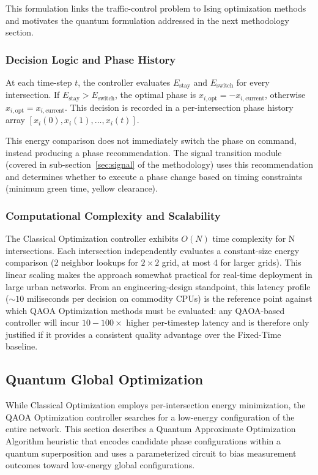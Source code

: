 \documentclass[12pt]{article}
\begin{document}
This formulation links the traffic-control problem to Ising optimization methods and motivates the quantum formulation addressed in the next methodology section.

\subsubsection{Decision Logic and Phase History}

At each time-step $t$, the controller evaluates $E_{\text{stay}}$ and $E_{\text{switch}}$ for every intersection. If $E_{\text{stay}} > E_{\text{switch}}$, the optimal phase is $x_{i,\text{opt}} = -x_{i,\text{current}}$, otherwise $x_{i,\text{opt}} = x_{i,\text{current}}$. This decision is recorded in a per-intersection phase history array $[x_{i}(0), x_{i}(1), \ldots, x_{i}(t)]$.


This energy comparison does not immediately switch the phase on command, instead producing a phase recommendation. The signal transition module (covered in sub-section~\ref{sec:signal} of the methodology) uses this recommendation and determines whether to execute a phase change based on timing constraints (minimum green time, yellow clearance).

\subsubsection{Computational Complexity and Scalability}

The Classical Optimization controller exhibits $O(N)$ time complexity for N intersections. Each intersection independently evaluates a constant-size energy comparison (2 neighbor lookups for $2 \times 2$ grid, at most 4 for larger grids). This linear scaling makes the approach somewhat practical for real-time deployment in large urban networks. From an engineering-design standpoint, this latency profile ($\sim 10$ miliseconds per decision on commodity CPUs) is the reference point against which QAOA Optimization methods must be evaluated: any QAOA-based controller will incur $10-100 \times$ higher per-timestep latency and is therefore only justified if it provides a consistent quality advantage over the Fixed-Time baseline.


\subsection{Quantum Global Optimization}

While Classical Optimization employs per-intersection energy minimization, the QAOA Optimization controller searches for a low-energy configuration of the entire network. This section describes a Quantum Approximate Optimization Algorithm heuristic that encodes candidate phase configurations within a quantum superposition and uses a parameterized circuit to bias measurement outcomes toward low-energy global configurations.
\end{document}
